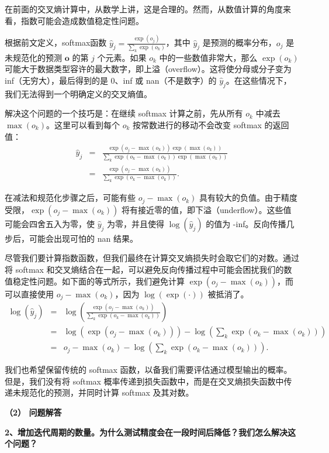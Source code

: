 \documentclass[UTF8]{ctexart}
\begin{document}
	在前面的交叉熵计算中，从数学上讲，这是合理的。然而，从数值计算的角度来看，指数可能会造成数值稳定性问题。
	
	根据前文定义，softmax函数 $\hat{y}_j = \frac{\exp(o_j)}{\sum_k \exp(o_k)}$，其中 $\hat{y}_j$ 是预测的概率分布，$o_j$ 是未规范化的预测 $\bm{o}$ 的第 $j$ 个元素。如果 $o_k$ 中的一些数值非常大，那么 $\exp(o_k)$ 可能大于数据类型容许的最大数字，即上溢（overflow）。这将使分母或分子变为 inf（无穷大），最后得到的是 0、inf 或 nan（不是数字）的 $\hat{y}_j$。在这些情况下，我们无法得到一个明确定义的交叉熵值。
	
	解决这个问题的一个技巧是：在继续 softmax 计算之前，先从所有 $o_k$ 中减去 $\max(o_k)$。这里可以看到每个 $o_k$ 按常数进行的移动不会改变 softmax 的返回值：
	\begin{eqnarray*}
		\hat{y}_j &=& \frac{\exp(o_j - \max(o_k)) \exp(\max(o_k))}{\sum_k \exp(o_k - \max(o_k)) \exp(\max(o_k))}\\
		&=& \frac{\exp(o_j - \max(o_k))}{\sum_k \exp(o_k - \max(o_k))}.
	\end{eqnarray*}

	在减法和规范化步骤之后，可能有些 $o_j - \max(o_k)$ 具有较大的负值。由于精度受限，$\exp(o_j - \max(o_k))$ 将有接近零的值，即下溢（underflow）。这些值可能会四舍五入为零，使 $\hat{y}_j$ 为零，并且使得 $\log(\hat{y}_j)$ 的值为 -inf。反向传播几步后，可能会出现可怕的 nan 结果。
	
	尽管我们要计算指数函数，但我们最终在计算交叉熵损失时会取它们的对数。通过将 softmax 和交叉熵结合在一起，可以避免反向传播过程中可能会困扰我们的数值稳定性问题。如下面的等式所示，我们避免计算 $\exp(o_j - \max(o_k))$，而可以直接使用 $o_j - \max(o_k)$，因为 $\log(\exp(\cdot))$ 被抵消了。
	\begin{eqnarray*}
		\log(\hat{y}_j) &=& \log\left(\frac{\exp(o_j - \max(o_k))}{\sum_k \exp(o_k - \max(o_k))}\right)\\
		&=& \log\left(\exp(o_j - \max(o_k))\right) - \log\left(\sum_k \exp(o_k - \max(o_k))\right)\\
		&=& o_j - \max(o_k) - \log\left(\sum_k \exp(o_k - \max(o_k))\right).
	\end{eqnarray*}
	
	
	我们也希望保留传统的 softmax 函数，以备我们需要评估通过模型输出的概率。但是，我们没有将 softmax 概率传递到损失函数中，而是在交叉熵损失函数中传递未规范化的预测，并同时计算 softmax 及其对数。
	
	\newpage
	\textbf{（2） 问题解答}
	
	\textbf{2、增加迭代周期的数量。为什么测试精度会在一段时间后降低？我们怎么解决这个问题？}
	
\end{document}
